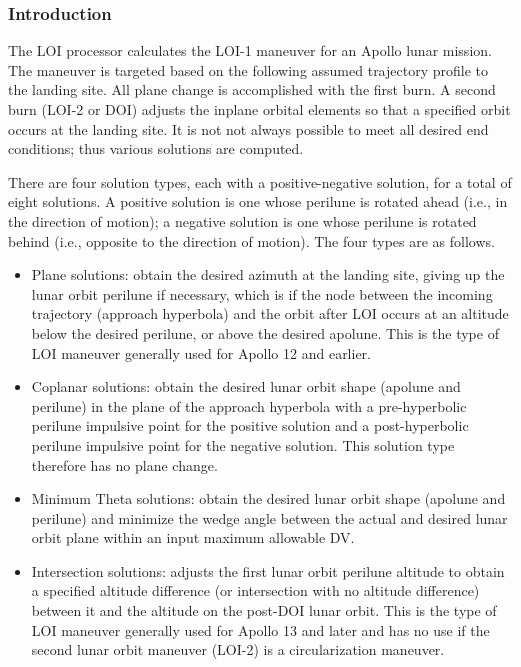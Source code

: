 \documentclass[11pt]{article} %
\begin{document}
\subsubsection{Introduction}

The LOI processor calculates the LOI-1 maneuver for an Apollo lunar mission. The maneuver is targeted based on the following assumed trajectory profile to the landing site. All plane change is accomplished with the first burn. A second burn (LOI-2 or DOI) adjusts the inplane orbital elements so that a specified orbit occurs at the landing site. It is not not always possible to meet all desired end conditions; thus various solutions are computed.

There are four solution types, each with a positive-negative solution, for a total of eight solutions. A positive solution is one whose perilune is rotated ahead (i.e., in the direction of motion); a negative solution is one whose perilune is rotated behind (i.e., opposite to the direction of motion). The four types are as follows.

\begin{itemize}
	\item Plane solutions: obtain the desired azimuth at the landing site, giving up the lunar orbit perilune if necessary, which is if the node between the incoming trajectory (approach hyperbola) and the orbit after LOI occurs at an altitude below the desired perilune, or above the desired apolune. This is the type of LOI maneuver generally used for Apollo 12 and earlier.
\item Coplanar solutions: obtain the desired lunar orbit shape (apolune and perilune) in the plane of the approach hyperbola with a pre-hyperbolic perilune impulsive point for the positive solution and a post-hyperbolic perilune impulsive point for the negative solution. This solution type therefore has no plane change.
\item Minimum Theta solutions: obtain the desired lunar orbit shape (apolune and perilune) and minimize the wedge angle between the actual and desired lunar orbit plane within an input maximum allowable DV.
\item Intersection solutions: adjusts the first lunar orbit perilune altitude to obtain a specified altitude difference (or intersection with no altitude difference) between it and the altitude on the post-DOI lunar orbit. This is the type of LOI maneuver generally used for Apollo 13 and later and has no use if the second lunar orbit maneuver (LOI-2) is a circularization maneuver.
\end{itemize}
\end{document}
